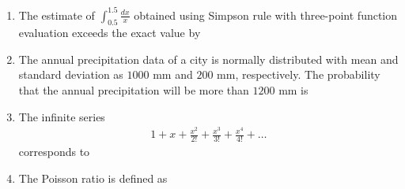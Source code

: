 \documentclass[journal]{IEEEtran}
\begin{document}
\begin{enumerate}

\item The estimate of $\int_{0.5}^{1.5} \frac{dx}{x}$ obtained using Simpson rule with three-point function evaluation exceeds the exact value by \hfill {}
\begin{enumerate}
\end{enumerate}

\item The annual precipitation data of a city is normally distributed with mean and standard deviation as $1000$ mm and $200$ mm, respectively. The probability that the annual precipitation will be more than $1200$ mm is \hfill {}
\begin{enumerate}
\end{enumerate}

\item The infinite series 
\begin{align}
    1+x+\frac{x^2}{2!}+\frac{x^3}{3!}+\frac{x^4}{4!}+\dots
\end{align} 
corresponds to \hfill {}
\begin{enumerate}
\end{enumerate}

\item The Poisson ratio is defined as \hfill {}
\begin{enumerate}
\end{enumerate}


\end{enumerate}
\end{document}
